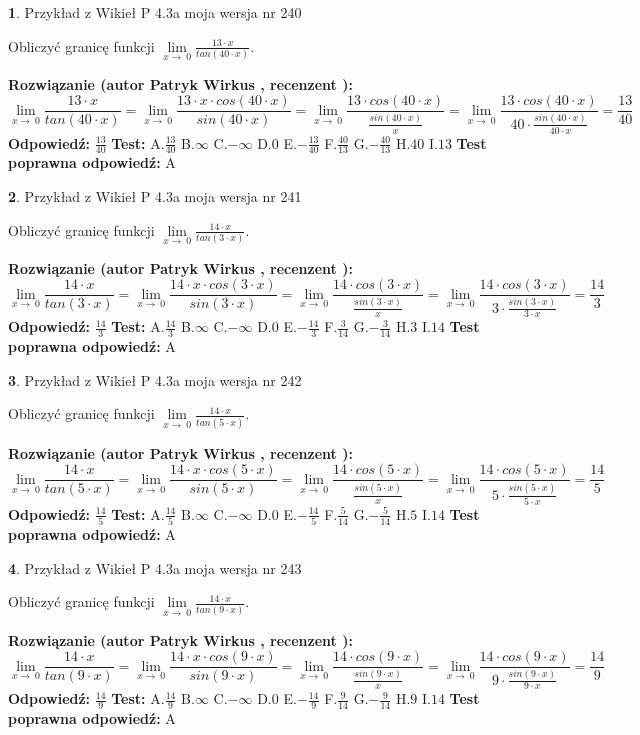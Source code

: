 \documentclass[12pt, a4paper]{article}
\theoremstyle{definition} %
\newtheorem{zad}{}
\newcommand{\zadStart}[1]{\begin{zad}#1\newline}
\newcommand{\zadStop}{\end{zad}}
\newcommand{\rozwStart}[2]{\noindent \textbf{Rozwiązanie (autor #1 , recenzent #2): }\newline}
\newcommand{\rozwStop}{\newline}
\newcommand{\odpStart}{\noindent \textbf{Odpowiedź:}\newline}
\newcommand{\odpStop}{\newline}
\newcommand{\testStart}{\noindent \textbf{Test:}\newline}
\newcommand{\testStop}{\newline}
\newcommand{\kluczStart}{\noindent \textbf{Test poprawna odpowiedź:}\newline}
\newcommand{\kluczStop}{\newline}
\begin{document}
\zadStart{Przykład z Wikieł P 4.3a moja wersja nr 240}


Obliczyć granicę funkcji $\lim\limits_{x\to\ 0}\frac{13 \cdot x}{tan(40 \cdot x)}$.
\zadStop
\rozwStart{Patryk Wirkus}{}
$$\lim\limits_{x\to\ 0}\frac{13 \cdot x}{tan(40 \cdot x)}=\lim\limits_{x\to\ 0}\frac{13 \cdot x \cdot cos(40 \cdot x)}{sin(40 \cdot x)}=\lim\limits_{x\to\ 0}\frac{13 \cdot cos(40 \cdot x)}{\frac{sin(40 \cdot x)}{x}}=\lim\limits_{x\to\ 0}\frac{13 \cdot cos(40 \cdot x)}{40 \cdot \frac{sin(40 \cdot x)}{40 \cdot x}} = \frac{13}{40}$$
\rozwStop
\odpStart
$\frac{13}{40}$
\odpStop
\testStart
A.$\frac{13}{40}$
B.$\infty$
C.$-\infty$
D.$0$
E.$-\frac{13}{40}$
F.$\frac{40}{13}$
G.$-\frac{40}{13}$
H.$40$
I.$13$
\testStop
\kluczStart
A
\kluczStop



\zadStart{Przykład z Wikieł P 4.3a moja wersja nr 241}


Obliczyć granicę funkcji $\lim\limits_{x\to\ 0}\frac{14 \cdot x}{tan(3 \cdot x)}$.
\zadStop
\rozwStart{Patryk Wirkus}{}
$$\lim\limits_{x\to\ 0}\frac{14 \cdot x}{tan(3 \cdot x)}=\lim\limits_{x\to\ 0}\frac{14 \cdot x \cdot cos(3 \cdot x)}{sin(3 \cdot x)}=\lim\limits_{x\to\ 0}\frac{14 \cdot cos(3 \cdot x)}{\frac{sin(3 \cdot x)}{x}}=\lim\limits_{x\to\ 0}\frac{14 \cdot cos(3 \cdot x)}{3 \cdot \frac{sin(3 \cdot x)}{3 \cdot x}} = \frac{14}{3}$$
\rozwStop
\odpStart
$\frac{14}{3}$
\odpStop
\testStart
A.$\frac{14}{3}$
B.$\infty$
C.$-\infty$
D.$0$
E.$-\frac{14}{3}$
F.$\frac{3}{14}$
G.$-\frac{3}{14}$
H.$3$
I.$14$
\testStop
\kluczStart
A
\kluczStop



\zadStart{Przykład z Wikieł P 4.3a moja wersja nr 242}


Obliczyć granicę funkcji $\lim\limits_{x\to\ 0}\frac{14 \cdot x}{tan(5 \cdot x)}$.
\zadStop
\rozwStart{Patryk Wirkus}{}
$$\lim\limits_{x\to\ 0}\frac{14 \cdot x}{tan(5 \cdot x)}=\lim\limits_{x\to\ 0}\frac{14 \cdot x \cdot cos(5 \cdot x)}{sin(5 \cdot x)}=\lim\limits_{x\to\ 0}\frac{14 \cdot cos(5 \cdot x)}{\frac{sin(5 \cdot x)}{x}}=\lim\limits_{x\to\ 0}\frac{14 \cdot cos(5 \cdot x)}{5 \cdot \frac{sin(5 \cdot x)}{5 \cdot x}} = \frac{14}{5}$$
\rozwStop
\odpStart
$\frac{14}{5}$
\odpStop
\testStart
A.$\frac{14}{5}$
B.$\infty$
C.$-\infty$
D.$0$
E.$-\frac{14}{5}$
F.$\frac{5}{14}$
G.$-\frac{5}{14}$
H.$5$
I.$14$
\testStop
\kluczStart
A
\kluczStop



\zadStart{Przykład z Wikieł P 4.3a moja wersja nr 243}


Obliczyć granicę funkcji $\lim\limits_{x\to\ 0}\frac{14 \cdot x}{tan(9 \cdot x)}$.
\zadStop
\rozwStart{Patryk Wirkus}{}
$$\lim\limits_{x\to\ 0}\frac{14 \cdot x}{tan(9 \cdot x)}=\lim\limits_{x\to\ 0}\frac{14 \cdot x \cdot cos(9 \cdot x)}{sin(9 \cdot x)}=\lim\limits_{x\to\ 0}\frac{14 \cdot cos(9 \cdot x)}{\frac{sin(9 \cdot x)}{x}}=\lim\limits_{x\to\ 0}\frac{14 \cdot cos(9 \cdot x)}{9 \cdot \frac{sin(9 \cdot x)}{9 \cdot x}} = \frac{14}{9}$$
\rozwStop
\odpStart
$\frac{14}{9}$
\odpStop
\testStart
A.$\frac{14}{9}$
B.$\infty$
C.$-\infty$
D.$0$
E.$-\frac{14}{9}$
F.$\frac{9}{14}$
G.$-\frac{9}{14}$
H.$9$
I.$14$
\testStop
\kluczStart
A
\kluczStop
\end{document}
